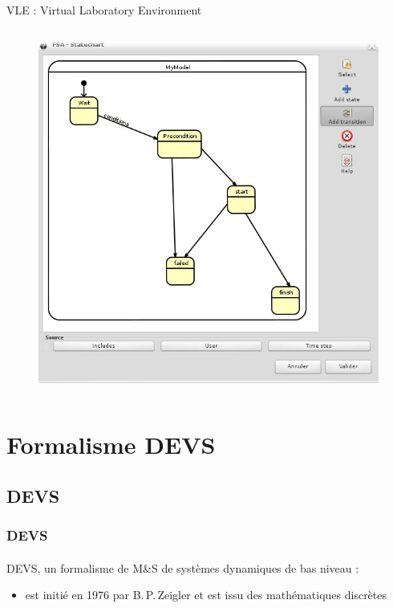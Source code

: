 \documentclass[xetex, compress, table, dvipsnames]{beamer}
\begin{document}
\begin{frame}
\begin{block}{VLE : Virtual Laboratory Environment}
\begin{columns}
\begin{column}{.47\textwidth}
        \begin{figure}
          \centering
          \includegraphics[width=.8\textwidth]{fsa}
        \end{figure}
      \end{column}
    \end{columns}
  \end{block}
\end{frame}

\begin{frame}
  \tableofcontents
\end{frame}

\section{Formalisme DEVS}

\subsection{DEVS}

\begin{frame}
  \frametitle{DEVS}
  \framesubtitle{}
  \begin{exampleblock}{DEVS, un formalisme de M\&S de systèmes
    dynamiques de bas niveau :}
    \begin{itemize}
      \item est initié en 1976 par B.\,P.\,Zeigler et est issu des
        \alert{mathématiques discrètes}
    \end{itemize}
  \end{exampleblock}
\end{frame}
\end{document}
